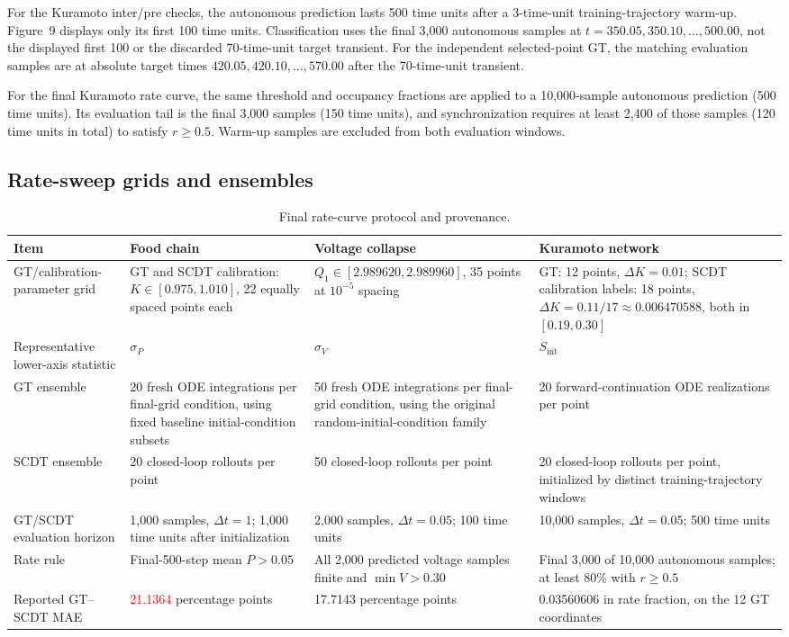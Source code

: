 \documentclass[10pt,a4paper]{article}
\begin{document}
For the Kuramoto inter/pre checks, the autonomous prediction lasts 500 time
units after a 3-time-unit training-trajectory warm-up. Figure~9 displays only
its first 100 time units. Classification uses the final 3,000 autonomous
samples at $t=350.05,350.10,\ldots,500.00$, not the displayed first 100 or
the discarded 70-time-unit target transient. For the independent selected-point
GT, the matching evaluation samples are at absolute target times
$420.05,420.10,\ldots,570.00$ after the 70-time-unit transient.

For the final Kuramoto rate curve, the same threshold and occupancy fractions
are applied to a 10,000-sample autonomous prediction (500 time units). Its
evaluation tail is the final 3,000 samples (150 time units), and synchronization
requires at least 2,400 of those samples (120 time units in total) to satisfy
$r\geq0.5$. Warm-up samples are excluded from both evaluation windows.

\subsection{Rate-sweep grids and ensembles}

\begin{table}[ht]
\centering
\caption{Final rate-curve protocol and provenance.}
\label{tab:rate}
\small
\begin{tabularx}{\textwidth}{L{29mm} Y Y Y}
\toprule
Item & Food chain & Voltage collapse & Kuramoto network \\
\midrule
GT/calibration-parameter grid
& GT and SCDT calibration: $K\in[0.975,1.010]$, 22 equally spaced points each
& $Q_1\in[2.989620,2.989960]$, 35 points at $10^{-5}$ spacing
& GT: 12 points, $\Delta K=0.01$; SCDT calibration labels: 18 points, $\Delta K=0.11/17\approx0.006470588$, both in $[0.19,0.30]$ \\
Representative lower-axis statistic
& $\sigma_P$
& $\sigma_V$
& $S_{\mathrm{int}}$ \\
GT ensemble
& 20 fresh ODE integrations per final-grid condition, using fixed baseline initial-condition subsets
& 50 fresh ODE integrations per final-grid condition, using the original random-initial-condition family
& 20 forward-continuation ODE realizations per point \\
SCDT ensemble
& 20 closed-loop rollouts per point
& 50 closed-loop rollouts per point
& 20 closed-loop rollouts per point, initialized by distinct training-trajectory windows \\
GT/SCDT evaluation horizon
& 1,000 samples, $\Delta t=1$; 1,000 time units after initialization
& 2,000 samples, $\Delta t=0.05$; 100 time units
& 10,000 samples, $\Delta t=0.05$; 500 time units \\
Rate rule
& Final-500-step mean $P>0.05$
& All 2,000 predicted voltage samples finite and $\min V>0.30$
& Final 3,000 of 10,000 autonomous samples; at least 80\% with $r\geq0.5$ \\
Reported GT--SCDT MAE
& \textcolor{red}{21.1364} percentage points
& 17.7143 percentage points
& 0.03560606 in rate fraction, on the 12 GT coordinates \\
\bottomrule
\end{tabularx}
\end{table}
\end{document}
